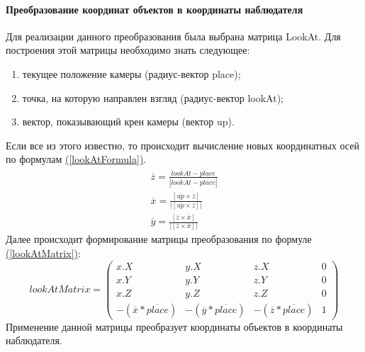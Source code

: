 \documentclass{article}
\begin{document}
	\paragraph{Преобразование координат объектов в координаты наблюдателя}
	\indent Для реализации данного преобразования была выбрана матрица LookAt. Для построения этой матрицы необходимо знать следующее:
	\begin{enumerate}
		\item текущее положение камеры (радиус-вектор place);
		\item точка, на которую направлен взгляд (радиус-вектор lookAt);
		\item вектор, показывающий крен камеры (вектор up).
	\end{enumerate}
	Если все из этого известно, то происходит вычисление новых координатных осей по формулам \hyperref[lookAtFormula]{(\ref{lookAtFormula})}.
	\begin{equation}\label{lookAtFormula}
	\begin{split}
			 \overline{z} = \frac{\overline{lookAt} - \overline{place}}{|\overline{lookAt} - \overline{place}|} \\
			 \overline{x} = \frac{[\overline{up} \times \overline{z}]}{|[\overline{up} \times \overline{z}]|} \\
			 \overline{y} = \frac{[\overline{z} \times \overline{x}]}{|[\overline{z} \times \overline{x}]|}
	\end{split}
           \end{equation}
	Далее происходит формирование матрицы преобразования по формуле \hyperref[lookAtMatrix]{(\ref{lookAtMatrix})}:
		\begin{equation}\label{lookAtMatrix}
		lookAtMatrix =
		\begin{pmatrix}
		x.X & y.X & z.X & 0\\
		x.Y & y.Y & z.Y & 0\\
		x.Z & y.Z & z.Z & 0\\
		-(\overline{x} * \overline{place}) & -(\overline{y} * \overline{place}) & -(\overline{z} * \overline{place}) & 1
		\end{pmatrix}
		\end{equation}
	Применение данной матрицы преобразует координаты объектов в координаты наблюдателя.
\end{document}
